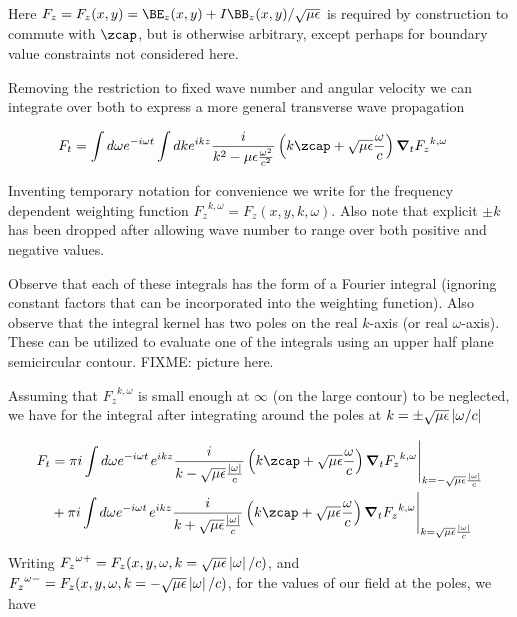 Here $F_z = F_z(x,y) = \BE_z(x,y) + I\BB_z(x,y)/\sqrt{\mu\epsilon}$ is required by construction to commute with $\zcap$, but is otherwise arbitrary, except perhaps for boundary value constraints not considered here.

Removing the restriction to fixed wave number and angular velocity we can integrate over both to express a more general transverse wave propagation

\begin{align}\label{eqn:waveguideRetardedAdvanced:foo8}
F_t &= \int d\omega e^{-i\omega t} \int dk e^{ikz} \frac{i}{k^2 - \mu\epsilon\frac{\omega^2}{c^2}} \left(k \zcap + \sqrt{\mu\epsilon}\frac{\omega}{c}\right) \spacegrad_t {F_z}^{k,\omega}
\end{align}

Inventing temporary notation for convenience we write for the frequency dependent weighting function ${F_z}^{k,\omega} = F_z(x,y,k,\omega)$.  Also note that explicit $\pm k$ has been dropped after allowing wave number to range over both positive and negative values.

Observe that each of these integrals has the form of a Fourier integral (ignoring constant factors that can be incorporated into the weighting function).  Also observe that the integral kernel has two poles on the real $k$-axis (or real $\omega$-axis).  These can be utilized to evaluate one of the integrals using an upper half plane semicircular contour.  FIXME: picture here.

Assuming that ${F_z}^{k,\omega}$ is small enough at $\infty$ (on the large contour) to be neglected, we have for the integral after integrating around the poles at $k = \pm \sqrt{\mu\epsilon}\left\lvert{\omega/c}\right\rvert$

\begin{align*} %
F_t 
&= 
\pi i 
\int d\omega e^{-i\omega t} 
{\left.
e^{ikz} \frac{i}{k - \sqrt{\mu\epsilon}\frac{\Abs{\omega}}{c}} \left(k \zcap + \sqrt{\mu\epsilon}\frac{\omega}{c}\right) \spacegrad_t {F_z}^{k,\omega}
\right\vert}_{k=-\sqrt{\mu\epsilon}\frac{\Abs{\omega}}{c}} \\
&+ 
\pi i 
\int d\omega e^{-i\omega t} 
{\left.
e^{ikz} \frac{i}{k + \sqrt{\mu\epsilon}\frac{\Abs{\omega}}{c}} \left(k \zcap + \sqrt{\mu\epsilon}\frac{\omega}{c}\right) \spacegrad_t {F_z}^{k,\omega}
\right\vert}_{k=\sqrt{\mu\epsilon}\frac{\Abs{\omega}}{c}}
\end{align*}

Writing ${F_z}^{\omega+} = F_z(x,y,\omega, k=\sqrt{\mu\epsilon}\left\lvert{\omega}\right\rvert/c)$, and ${F_z}^{\omega-} = F_z(x,y,\omega, k=-\sqrt{\mu\epsilon}\left\lvert{\omega}\right\rvert/c)$, for the values of our field at the poles, we have

